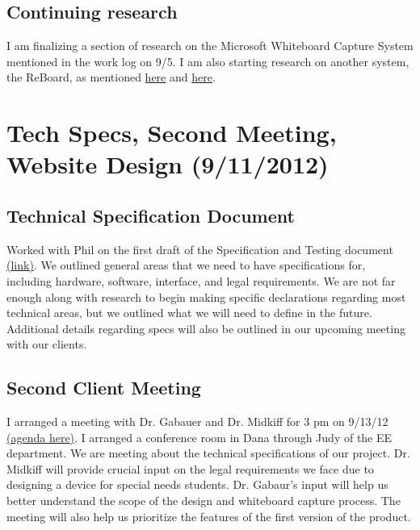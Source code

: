 \documentclass[]{article}
\begin{document}
		\subsection*{Continuing research}
I am finalizing a section of research on the Microsoft Whiteboard Capture System mentioned in the work log on 9/5.  I am also starting research on another system, the ReBoard, as mentioned \href{http://www.fxpal.com/publications/FXPAL-PR-10-546.pdf}{here} and \href{http://www.fxpal.com/?p=reboard}{here}.  
		

	\section{Tech Specs, Second Meeting, Website Design (9/11/2012)}

		\subsection*{Technical Specification Document}
		Worked with Phil on the first draft of the Specification and Testing document \href{https://docs.google.com/viewer?a=v&pid=sites&srcid=ZGVmYXVsdGRvbWFpbnxidXByb3BhbmV8Z3g6NjhkOWVjMjIyZjY3ZTM4ZA}{(link)}.  We outlined general areas that we need to have specifications for, including hardware, software, interface, and legal requirements.  We are not far enough along with research to begin making specific declarations regarding most technical areas, but we outlined what we will need to define in the future.  Additional details regarding specs will also be outlined in our upcoming meeting with our clients.

		\subsection*{Second Client Meeting}
		I arranged a meeting with Dr. Gabauer and Dr. Midkiff for 3 pm on 9/13/12 \href{https://docs.google.com/viewer?a=v&pid=sites&srcid=ZGVmYXVsdGRvbWFpbnxidXByb3BhbmV8Z3g6NDMwMGY4NTlmYWQ2NjUx}{(agenda here)}.  I arranged a conference room in Dana through Judy of the EE department.  We are meeting about the technical specifications of our project.  Dr. Midkiff will provide crucial input on the legal requirements we face due to designing a device for special needs students.  Dr. Gabaur's input will help us better understand the scope of the design and whiteboard capture process. The meeting will also help us prioritize the features of the first version of the product.
\end{document}
